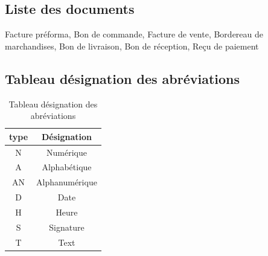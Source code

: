 \documentclass[edit,12pt,a4paper,ChapStyle,oneside,doubleinterligne]{report}
\begin{document}
\subsection{Liste des documents}
Facture préforma, Bon de commande, Facture de vente, Bordereau de marchandises, Bon de livraison, Bon de réception, Reçu de paiement
\subsection{Tableau désignation des abréviations}
\begin{table}[h!]
    \centering
    \begin{tabular}{|c|c|}
    \hline
        type & Désignation \\
        \hline
        N & Numérique \\
        A & Alphabétique \\
        AN & Alphanumérique \\
        D & Date\\
        H & Heure \\
        S & Signature \\
        T & Text \\
        \hline
    \end{tabular}
    \caption{Tableau désignation des abréviations}
    \label{tab:désignation des abréviations}
\end{table}
\newpage
\end{document}
